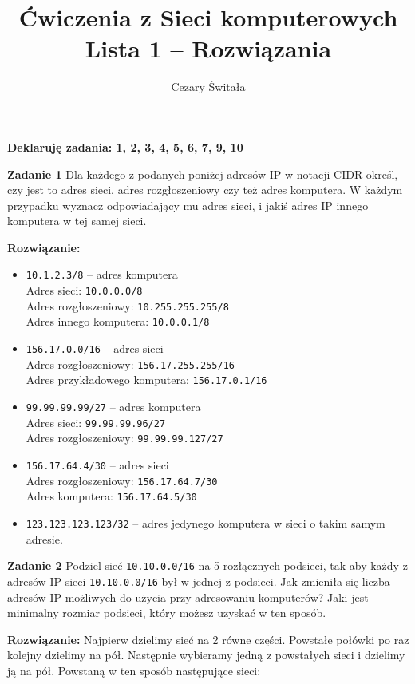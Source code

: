 \documentclass[12pt,a4paper]{article}
\title{Ćwiczenia z Sieci komputerowych \\ Lista 1 -- Rozwiązania}
\author{Cezary Świtała}
\begin{document}
\maketitle

\vskip 0.2cm
\noindent
\textbf{Deklaruję zadania: 1, 2, 3, 4, 5, 6, 7, 9, 10}
\vskip 0.2cm


\noindent
\textbf{Zadanie 1} Dla każdego z podanych poniżej adresów IP w notacji CIDR określ, czy jest to adres sieci, adres rozgłoszeniowy czy też adres komputera. W każdym przypadku wyznacz odpowiadający mu adres sieci, i jakiś adres IP innego komputera w tej samej sieci.
\vskip 0.2cm

\noindent
\textbf{Rozwiązanie:}
\begin{itemize}
	\item \texttt{10.1.2.3/8} -- adres komputera \\ 
		Adres sieci: \texttt{10.0.0.0/8} \\
		Adres rozgłoszeniowy: \texttt{10.255.255.255/8} \\
		Adres innego komputera: \texttt{10.0.0.1/8}
	\item \texttt{156.17.0.0/16} -- adres sieci \\
		Adres rozgłoszeniowy: \texttt{156.17.255.255/16} \\
		Adres przykładowego komputera: \texttt{156.17.0.1/16}
	\item \texttt{99.99.99.99/27} -- adres komputera \\
		Adres sieci: \texttt{99.99.99.96/27} \\
		Adres rozgłoszeniowy: \texttt{99.99.99.127/27}
	\item \texttt{156.17.64.4/30} -- adres sieci \\
		Adres rozgłoszeniowy: \texttt{156.17.64.7/30} \\
		Adres komputera: \texttt{156.17.64.5/30}
	\item \texttt{123.123.123.123/32} -- adres jedynego komputera w sieci o takim samym adresie.
\end{itemize}

\vskip 0.2cm
\noindent
\textbf{Zadanie 2} Podziel sieć \texttt{10.10.0.0/16} na 5 rozłącznych podsieci, tak aby każdy z adresów IP sieci \texttt{10.10.0.0/16} był w jednej z podsieci. Jak zmieniła się liczba adresów IP możliwych do użycia przy adresowaniu komputerów? Jaki jest minimalny rozmiar podsieci, który możesz uzyskać w ten sposób.
\vskip 0.2cm

\noindent
\textbf{Rozwiązanie:}
Najpierw dzielimy sieć na 2 równe części. Powstałe połówki po raz kolejny dzielimy na pół. Następnie wybieramy jedną z powstałych sieci i dzielimy ją na pół. Powstaną w ten sposób następujące sieci:
\end{document}

